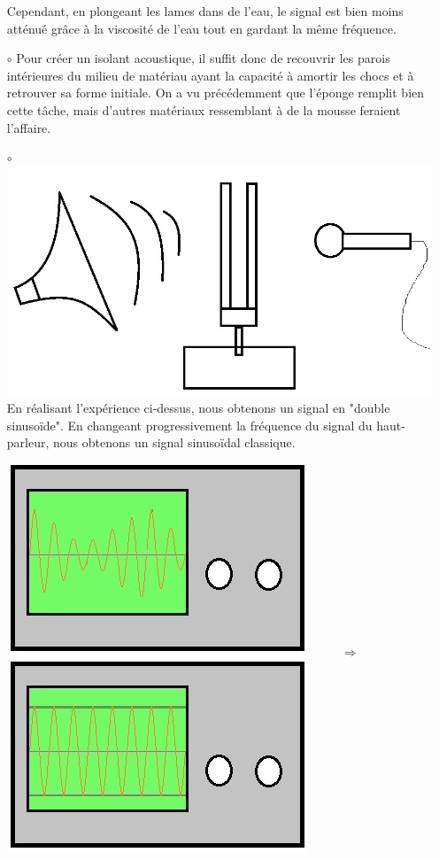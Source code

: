 \documentclass[12pt,a4paper]{article}
\begin{document}
\begin{itemize}
		Cependant, en plongeant les lames dans de l'eau, le signal est bien moins atténué grâce à la viscosité de l'eau tout en gardant la même fréquence.
		
		\item[$\circ$] Pour créer un isolant acoustique, il suffit donc de recouvrir les parois intérieures du milieu de matériau ayant la capacité à amortir les chocs et à retrouver sa forme initiale. On a vu précédemment que l'éponge remplit bien cette tâche, mais d'autres matériaux ressemblant à de la mousse feraient l'affaire.
		
		\item[$\circ$] \includegraphics[scale=0.4]{schem2} \\
		
		
		En réalisant l'expérience ci-dessus, nous obtenons un signal en "double sinusoïde". En changeant progressivement la fréquence du signal du haut-parleur, nous obtenons un signal sinusoïdal classique. \\
		\begin{center}
			\includegraphics[scale=0.5]{schem3} $\hspace{1cm} \Rightarrow \hspace{1cm} $
			\includegraphics[scale=0.5]{schem1} 
		\end{center}
		

\end{itemize}
\end{document}

